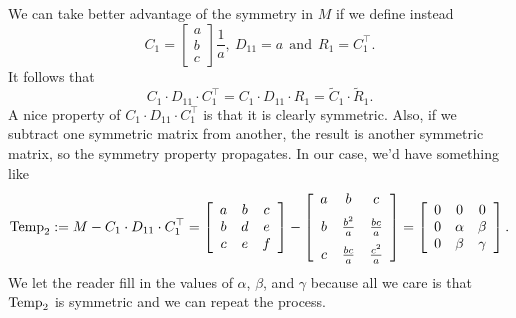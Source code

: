 We can take better advantage of the symmetry in $M$ if we define instead
\begin{equation}
    \label{eq:SymmetricM_LUStep1b}
   C_1= \left[\begin{array}{c} 
   a \\  b \\ c 
   \end{array}\right]\frac{1}{a}, ~D_{11}=a~~\text{and}~~R_1=C_1^\top.
\end{equation}
It follows that
\begin{equation}
    \label{eq:SymmetricM_LUStep1c}
   C_1 \cdot D_{11} \cdot C_1^\top = C_1 \cdot D_{11} \cdot R_1 = \tilde{C}_1 \cdot \tilde{R}_1.
\end{equation}
A nice property of $C_1 \cdot D_{11} \cdot C_1^\top$ is that it is clearly symmetric. Also, if we subtract one symmetric matrix from another, the result is another symmetric matrix, so the symmetry property propagates. In our case, we'd have something like
\begin{equation}
    \label{eq:SymmetricM_LUStep1d}
{\rm Temp}_{2} := M -C_1 \cdot D_{11} \cdot C_1^\top =\left[\begin{array}{ccc} 
   a & b & c\\
   b & d & e\\
   c & e & f
   \end{array}\right] - \left[\begin{array}{ccc} 
   a & b & c \medskip \\
   b & \frac{b^2}{a} & \frac{b c}{a} \medskip \\
   c & \frac{b c}{a} & \frac{c^2}{a}
   \end{array}\right] = \left[\begin{array}{ccc} 
   0& 0 & 0\\
   0 & \alpha & \beta\\
   0 & \beta & \gamma
   \end{array}\right].
\end{equation}
We let the reader fill in the values of $\alpha$, $\beta$, and $\gamma$ because all we care is that ${\rm Temp}_{2}$ is symmetric and we can repeat the process. \\

